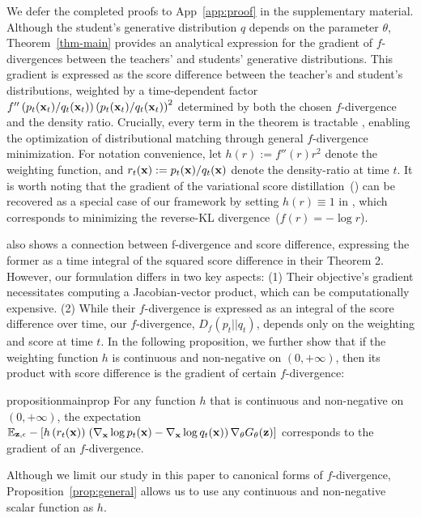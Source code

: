 We defer the completed proofs to App~\ref{app:proof} in the supplementary material. Although the student's generative distribution $q$ depends on the parameter $\theta$, Theorem~\ref{thm-main} provides an analytical expression for the gradient of $f$-divergences between the teachers' and students' generative distributions. This gradient is expressed as the score difference between the teacher's and student's distributions, weighted by a time-dependent factor $f''\left({p_t({\mathbf{x}}_t)}/{q_t({\mathbf{x}}_t)}\right)\left({p_t({\mathbf{x}}_t)}/{q_t({\mathbf{x}}_t)}\right)^2$ determined by both the chosen $f$-divergence and the density ratio. Crucially, every term in the theorem is tractable
, enabling the optimization of distributional matching through general $f$-divergence minimization. For notation convenience, let $h(r) := f''(r)r^2$ denote the weighting function, and $r_t({\mathbf{x}}) := p_t({\mathbf{x}})/q_t({\mathbf{x}})$ denote the density-ratio at time $t$. It is worth noting that the gradient of the variational score distillation~() can be recovered as a special case of our framework by setting $h(r)\equiv 1$ %
in , which corresponds to minimizing the reverse-KL divergence~($f(r)=-\log r $). 

\cite{song2021maximum} also shows a connection between f-divergence and score difference, expressing the former as a time integral of the squared score difference in their Theorem 2. However, our formulation differs in two key aspects: (1) Their objective's gradient necessitates computing a Jacobian-vector product, which can be computationally expensive. 
(2) While their $f$-divergence is expressed as an integral of the score difference over time, our $f$-divergence, $D_f(p_t||q_t)$, depends only on the weighting and score at time $t$. In the following proposition, we further show that if the weighting function $h$ is continuous and non-negative on $(0, +\infty)$, then its product with score difference is the gradient of certain $f$-divergence:
\vspace{-5pt}
\begin{restatable}{proposition}{mainprop}\label{prop:general}
For any function $h$ that is continuous and non-negative on $(0, +\infty)$, the expectation 
$\mathbb{E}_{\substack{{\mathbf{z}},  \epsilon}}-\left[h\left(r_t({\mathbf{x}})\right)\right.\left({\nabla_{\mathbf{x}} \log p_t({\mathbf{x}})} - {\nabla_{\mathbf{x}} \log q_t({\mathbf{x}})} \right)  \nabla_\theta G_\theta({\mathbf{z}})]
$
corresponds to the gradient of an $f$-divergence.
\end{restatable}
Although we limit our study in this paper to canonical forms of $f$-divergence, Proposition~\ref{prop:general} allows us to use any continuous and non-negative scalar function as $h$.

